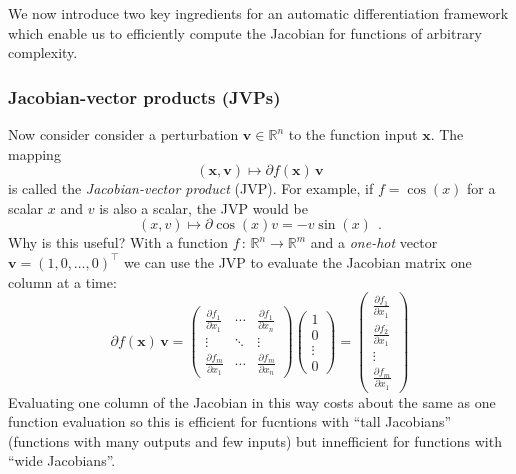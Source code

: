 \documentclass[12pt,dvipsnames]{report}
\renewcommand{\vec}[1]{\boldsymbol{\mathbf{#1}}}
\newcommand{\hquad}{~~}
\begin{document}
We now introduce two key ingredients for an automatic differentiation framework 
which enable us to efficiently compute the Jacobian for functions of arbitrary 
complexity.

\subsubsection{Jacobian-vector products (JVPs)}
Now consider consider a perturbation $\vec v\in\mathbb{R}^n$ to the function input 
$\vec x$. The  mapping 
\begin{equation}
(\vec{x}, \vec{v}) \mapsto \partial f(\vec{x})\,\vec v
\label{eq:jvp}
\end{equation}
is called the \textsl{Jacobian-vector product} (JVP). For example, if $f=\cos(x)$ 
for a scalar $x$ and $v$ is also a scalar, the JVP would be 
\begin{equation}
(x, v) \mapsto \partial \cos (x) v=-v \sin (x)\hquad .
\end{equation}
Why is this useful? With a function $f\,:\,\mathbb{R}^n\rightarrow\mathbb{R}^m$
and a \textsl{one-hot} vector $\vec v=(1, 0, \ldots, 0)^\intercal$ we can use  the JVP to 
evaluate the Jacobian matrix one column at a time:
\begin{equation}
    \partial f(\vec x)\,\vec v = 
    \begin{pmatrix}
\frac{\partial f_{1}}{\partial x_{1}} & \cdots & \frac{\partial f_{1}}{\partial x_{n}} \\
\vdots & \ddots & \vdots \\
\frac{\partial f_{m}}{\partial x_{1}} & \cdots & \frac{\partial f_{m}}{\partial x_{n}}
    \end{pmatrix}
    \begin{pmatrix}
        1\\
        0\\
        \vdots\\
        0
    \end{pmatrix}
    = \begin{pmatrix}
        \frac{\partial f_{1}}{\partial x_{1}}\\
        \frac{\partial f_{2}}{\partial x_{1}}\\
        \vdots\\
        \frac{\partial f_{m}}{\partial x_{1}}
    \end{pmatrix}
\end{equation}
Evaluating one column of the Jacobian in this way costs about the same as one function evaluation
so this is efficient for fucntions with ``tall Jacobians'' (functions with many outputs and few
inputs) but innefficient for functions with ``wide Jacobians''.
\end{document}
